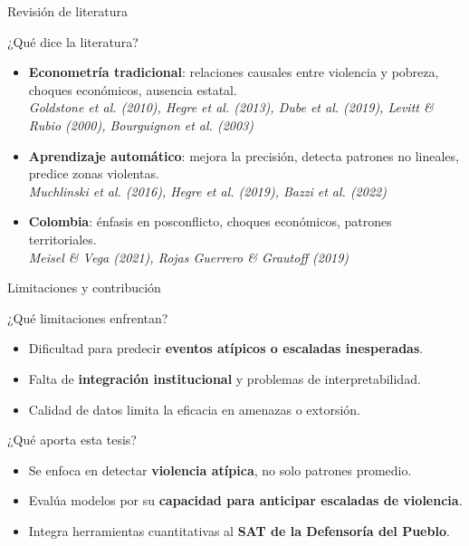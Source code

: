 
\begin{frame}{Revisión de literatura}
    \small
    \begin{block}{¿Qué dice la literatura?}
        \begin{itemize}
            \item \textbf{Econometría tradicional}: relaciones causales entre violencia y pobreza, choques económicos, ausencia estatal.\\
            \textit{Goldstone et al. (2010), Hegre et al. (2013), Dube et al. (2019), Levitt \& Rubio (2000), Bourguignon et al. (2003)}
            
            \item \textbf{Aprendizaje automático}: mejora la precisión, detecta patrones no lineales, predice zonas violentas.\\
            \textit{Muchlinski et al. (2016), Hegre et al. (2019), Bazzi et al. (2022)}

            \item \textbf{Colombia}: énfasis en posconflicto, choques económicos, patrones territoriales.\\
            \textit{Meisel \& Vega (2021), Rojas Guerrero \& Grautoff (2019)}
        \end{itemize}
    \end{block}
\end{frame}

\begin{frame}{Limitaciones y contribución}
    \small
        \begin{block}{¿Qué limitaciones enfrentan?}
        \begin{itemize}
            \item Dificultad para predecir \textbf{eventos atípicos o escaladas inesperadas}.
            \item Falta de \textbf{integración institucional} y problemas de interpretabilidad.
            \item Calidad de datos limita la eficacia en amenazas o extorsión.
        \end{itemize}
    \end{block}
    \begin{alertblock}{¿Qué aporta esta tesis?}
        \begin{itemize}
            \item Se enfoca en detectar \textbf{violencia atípica}, no solo patrones promedio.
            \item Evalúa modelos por su \textbf{capacidad para anticipar escaladas de violencia}.
            \item Integra herramientas cuantitativas al \textbf{SAT de la Defensoría del Pueblo}.
        \end{itemize}
    \end{alertblock}

\end{frame}